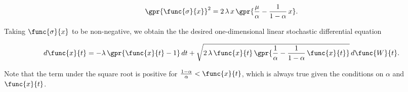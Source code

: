 \begin{equation}
	\gpr{\func{\sigma}{x}}^2 = 2\,\lambda\,x\,\gpr{\frac{\mu}{\alpha} - \frac{1}{1 - \alpha}\,x}.
\end{equation}

Taking $\func{\sigma}{x}$ to be non-negative, we obtain the the desired one-dimensional linear stochastic differential equation

\begin{equation}
	d\func{x}{t} = -\lambda\,\gpr{\func{x}{t} - 1}\,dt + \sqrt{2\,\lambda\,\func{x}{t}\,\gpr{\frac{1}{\alpha} - \frac{1}{1 - \alpha}\,\func{x}{t}}}\,d \func{W}{t}.
\end{equation}

Note that the term under the square root is positive for $\frac{1 - \alpha}{\alpha} < \func{x}{t}$, which is always true given the conditions on $\alpha$ and $\func{x}{t}$.


